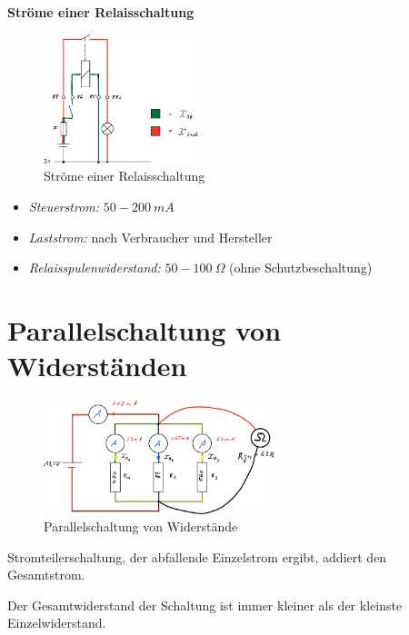\textbf{Ströme einer Relaisschaltung}

\begin{figure}[!ht]%
\centering
\includegraphics[width=0.4\textwidth]{images/Skizze/09_Stroeme_einer_Relaisschaltung_Skizze.pdf}
\caption{Ströme einer Relaisschaltung}
\end{figure}

\begin{itemize}
\item
  \emph{Steuerstrom:} $50 - 200~mA$
\item
  \emph{Laststrom:} nach Verbraucher und Hersteller
\item
  \emph{Relaisspulenwiderstand:} $50 - 100~\Omega$ (ohne
  Schutzbeschaltung)
\end{itemize}

\newpage

\section{Parallelschaltung von
Widerständen}\label{parallelschaltung-von-widerstaenden}

\begin{figure}[!ht]%
\centering
\includegraphics[width=0.6\textwidth]{images/Skizze/19_Parallelschaltung_Widerstaende_Skizze.pdf}
\caption{Parallelschaltung von Widerstände}
\end{figure}

Stromteilerschaltung, der abfallende Einzelstrom ergibt, addiert den
Gesamtstrom.

Der Gesamtwiderstand der Schaltung ist immer kleiner als der kleinste
Einzelwiderstand.

